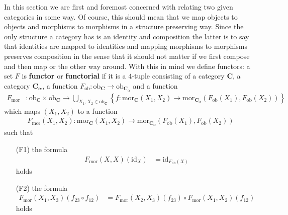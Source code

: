 In this section we are first and foremost concerned with relating two given categories in some way. Of course, this should mean that we map objects to objects and morphisms to morphisms in a structure preserving way. Since the only structure a category has is an identity and composition the latter is to say that identities are mapped to identities and mapping morphisms to morphisms preserves composition in the sense that it should not matter if we first compose and then map or the other way around. With this in mind we define functors: a set $F$ is \textbf{functor} or \textbf{functorial} if it is a $4$-tuple consisting of a category $\mathbf{C}$, a category $\mathbf{C_{\alpha}}$, a function $F_{\mathrm{ob}} \colon \mathrm{ob}_{\mathbf{C}} \rightarrow \mathrm{ob}_{\mathbf{C}_{\alpha}}$ and a function
\begin{align*}
  F_{\mathrm{mor}}
  &\colon
  \mathrm{ob}_{\mathbf{C}}
  \times
  \mathrm{ob}_{\mathbf{C}}
  \rightarrow
  \bigcup_{X_{1},X_{2} \in \mathrm{ob}_{\mathbf{C}}}
  \left\lbrace
    f
    \colon
    \mathrm{mor}_{\mathbf{C}}(X_{1},X_{2})
    \rightarrow
    \mathrm{mor}_{\mathbf{C}_{\alpha}}
    (F_{\mathrm{ob}}(X_{1}),F_{\mathrm{ob}}(X_{2}))
  \right\rbrace
\end{align*}
which maps $(X_{1},X_{2})$ to a function
\begin{align*}
  F_{\mathrm{mor}}(X_{1},X_{2})
  \colon
  \mathrm{mor}_{\mathbf{C}}(X_{1},X_{2})
  \rightarrow
  \mathrm{mor}_{\mathbf{C}_{\alpha}}
  (F_{\mathrm{ob}}(X_{1}),F_{\mathrm{ob}}(X_{2}))
\end{align*}
such that
\begin{enumerate}
\item[(F1)]
the formula
\begin{align*}
  F_{\mathrm{mor}}(X,X)(\mathrm{id}_{X})
  &=
  \mathrm{id}_{F_{\mathrm{ob}}(X)}
\end{align*}
holds
\item[(F2)]
the formula
\begin{align*}
  F_{\mathrm{mor}}(X_{1},X_{3})(f_{23} \circ f_{12})
  &=
  F_{\mathrm{mor}}(X_{2},X_{3})(f_{23})
  \circ
  F_{\mathrm{mor}}(X_{1},X_{2})(f_{12})
\end{align*}  
holds
\end{enumerate}
